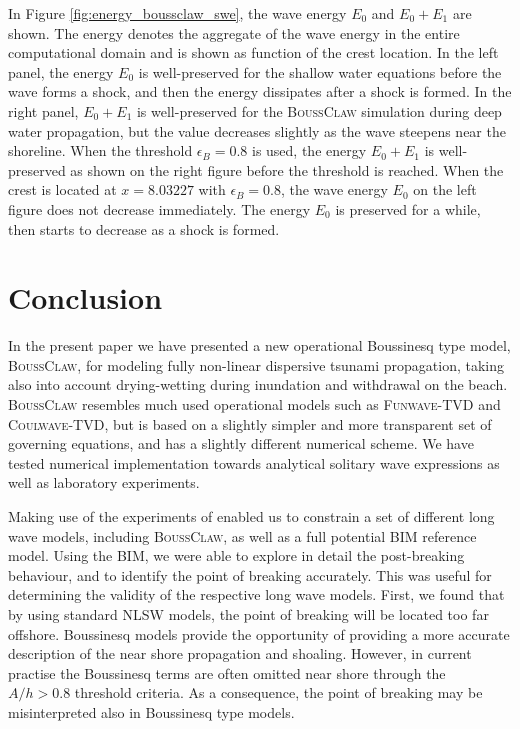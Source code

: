 \documentclass[review]{elsarticle}
\begin{document}
In Figure \ref{fig:energy_boussclaw_swe}, 
the wave energy $E_0$ and $E_0+E_1$ are shown. 
The energy denotes the aggregate 
of the wave energy in the entire computational domain 
and is shown as function of the crest location.
In the left panel, 
the energy $E_0$ is well-preserved 
for the shallow water equations 
before the wave forms a shock,
and then the energy dissipates after a shock is formed.
In the right panel, 
$E_0+E_1$ is well-preserved for the \textsc{BoussClaw} simulation during deep water propagation, but
the value decreases slightly as the wave steepens
near the shoreline.
When the threshold $\epsilon_B=0.8$ is used,
the energy $E_0+E_1$ is well-preserved 
as shown on the right figure before the threshold is reached. 
When the crest is located
at $x=8.03227$ with $\epsilon_B=0.8$, 
the wave energy $E_0$ on the left figure 
does not decrease immediately.
The energy $E_0$ is preserved for a while, 
then starts to decrease as a shock is formed. 

\section{Conclusion}
\label{sec:conclusion}

In the present paper we have presented a new operational 
Boussinesq type model, \textsc{BoussClaw},
for modeling fully non-linear dispersive tsunami propagation, taking also into account drying-wetting during inundation and withdrawal on the beach.
\textsc{BoussClaw} resembles much used operational models such as \textsc{Funwave-TVD} and
\textsc{Coulwave-TVD}, but is based on a slightly simpler and more transparent set of governing equations,
and has a slightly different numerical scheme. We have tested numerical implementation towards
analytical solitary wave expressions as well as laboratory experiments.

Making use of the experiments of \citet{synolakis1987runup} 
enabled us to
constrain a set of different long wave models, including \textsc{BoussClaw}, as well as a full potential
BIM reference model. Using the BIM, we were able to explore in detail the post-breaking behaviour,
and to identify the point of breaking accurately. This was useful for determining the 
validity of the respective long wave models. First, we found that by using standard NLSW models,
the point of breaking will be located too far offshore. Boussinesq models
provide the opportunity of providing a more accurate description of the near shore propagation and shoaling. 
However, in current practise the Boussinesq terms are often omitted near shore through the $A/h>0.8$ threshold criteria.
As a consequence, the point of breaking may be misinterpreted also in Boussinesq type models.
\end{document}
